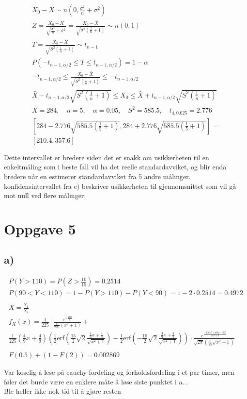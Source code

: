 \begin{gather*}
	X_0 - \bar X \sim n(0, \frac{\sigma^2}{n} + \sigma^2)
	\\
	Z = \frac{X_0 - \bar X}{\sqrt{\frac{\sigma^2}{n} + \sigma^2}} = \frac{X_0 - \bar X}{\sqrt{\sigma^2 \left(\frac{1}{n} + 1\right)}} \sim n(0, 1)
	\\
	T = \frac{X_0 - \bar X}{\sqrt{S^2 \left(\frac{1}{n} + 1\right)}} \sim t_{n - 1}
	\\
	P\left(-t_{n - 1, \alpha / 2} \leq T \leq t_{n - 1, \alpha / 2}\right) = 1 - \alpha
	\\
	-t_{n - 1, \alpha / 2} \leq \frac{X_0 - \bar X}{\sqrt{S^2 \left(\frac{1}{n} + 1\right)}} \leq -t_{n - 1, \alpha / 2}
	\\
	\bar X - t_{n - 1, \alpha / 2} \sqrt{S^2 \left(\frac{1}{n} + 1\right)} \leq X_0 \leq \bar X + t_{n - 1, \alpha / 2} \sqrt{S^2 \left(\frac{1}{n} + 1\right)}
	\\
	\bar X = 284, \quad n = 5, \quad \alpha = 0.05, \quad S^2 = 585.5, \quad t_{4, 0.025} = 2.776
	\\
	\left[284 - 2.776 \sqrt{585.5\left(\frac{1}{5} + 1\right)}, 284 + 2.776 \sqrt{585.5\left(\frac{1}{5} + 1\right)}\right] =
	\\
	\left[210.4, 357.6\right]
\end{gather*}

Dette intervallet er bredere siden det er snakk om usikkerheten til en enkeltmåling som i beste fall vil ha det reelle standardavviket, og blir enda bredere når en estimerer standardavviket fra 5 andre målinger. konfidensintervallet fra c) beskriver usikkerheten til gjennomsnittet som vil gå mot null ved flere målinger.


\section*{Oppgave 5}

\subsection*{a)}

\begin{gather*}
	P(Y > 110) = P\left(Z > \frac{10}{15}\right) = 0.2514
	\\
	P(90 < Y < 110) = 1 - P(Y > 110) - P(Y < 90) = 1 - 2 \cdot 0.2514 = 0.4972
	\\
	\\
	X = \frac{Y_1}{Y_2}
	\\
	f_X(x) =
	\frac{1}{225} \cdot \frac{e^{-\frac{400}{9}}}{\frac{\pi}{225}(x^2 + 1)}
	+
	\\
	\frac{1}{225} \left(\frac{4}{9} x + \frac{4}{9}\right) \left(
		\frac{1}{2} \text{erf}\left(\frac{15}{2} \sqrt{2} \frac{\frac{4}{9} x + \frac{4}{9}}{\sqrt{x^2 + 1}}\right)
		-
		\frac{1}{2} \text{erf}\left(-\frac{15}{2} \sqrt{2} \frac{\frac{4}{9} x + \frac{4}{9}}{\sqrt{x^2 + 1}}\right)
	\right)
	\cdot \frac{e^{\frac{-200 x^2 + 400 x - 200}{9 x^2 + 9}}}{\sqrt{2 \pi}\left(\frac{1}{15} \sqrt{x^2 + 1}\right)}
	\\
	\\
	F(0.5) + (1 - F(2)) = 0.002869
\end{gather*}

Var koselig å lese på cauchy fordeling og forholdsfordeling i et par timer, men føler det burde være en enklere måte å løse siste punktet i a...
\\
Ble heller ikke nok tid til å gjøre resten

